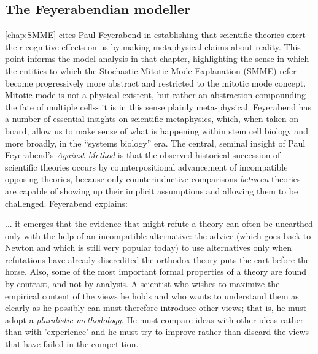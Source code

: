 \subsection{The Feyerabendian modeller}
\label{sec:Feyerabend}
\autoref{chap:SMME} cites Paul Feyerabend in establishing that scientific theories exert their cognitive effects on us by making metaphysical claims about reality. This point informs the model-analysis in that chapter, highlighting the sense in which the entities to which the Stochastic Mitotic Mode Explanation (SMME) refer become progressively more abstract and restricted to the mitotic mode concept. Mitotic mode is not a physical existent, but rather an abstraction compounding the fate of multiple cells- it is in this sense plainly meta-physical. Feyerabend has a number of essential insights on scientific metaphysics, which, when taken on board, allow us to make sense of what is happening within stem cell biology and more broadly, in the ``systems biology'' era. The central, seminal insight of Paul Feyerabend's \textit{Against Method} is that the observed historical succession of scientific theories occurs by counterpositional advancement of incompatible opposing theories, because only counterinductive comparisons \textit{between} theories are capable of showing up their implicit assumptions and allowing them to be challenged. Feyerabend explains:

\begin{longquote}
... it emerges that the evidence that might refute a
theory can often be unearthed only with the help of an incompatible
alternative: the advice (which goes back to Newton and which is still
very popular today) to use alternatives only when refutations have
already discredited the orthodox theory puts the cart before the
horse. Also, some of the most important formal properties of a theory
are found by contrast, and not by analysis. A scientist who wishes to
maximize the empirical content of the views he holds and who wants
to understand them as clearly as he possibly can must therefore
introduce other views; that is, he must adopt a \textit{pluralistic methodology}.
He must compare ideas with other ideas rather than with
'experience' and he must try to improve rather than discard the views
that have failed in the competition.\cite[p.20]{Feyerabend1993}
\end{longquote}

